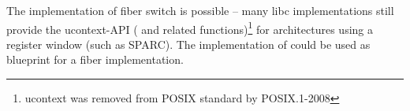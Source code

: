
The implementation of fiber switch is possible -- many libc implementations
still provide the ucontext-API ( and related
functions)\footnote{ucontext was removed from POSIX standard by POSIX.1-2008}
for architectures using a register window (such as SPARC). The implementation of
 could be used as blueprint for a fiber implementation.
